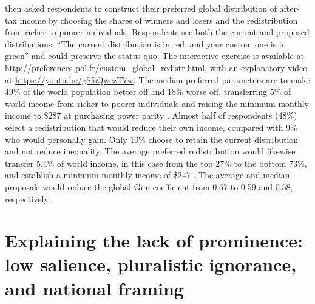 \documentclass[11pt,a4paper]{article}
\begin{document}

\citet{fabre_public_2026} then asked respondents to construct their preferred global distribution of after-tax income by choosing the shares of winners and losers and the redistribution from richer to poorer individuals. Respondents see both the current and proposed distributions: ``The current distribution is in red, and your custom one is in green'' and could preserve the status quo. The interactive exercise is available at \url{http://preferences-pol.fr/custom_global_redistr.html}, with an explanatory video at \url{https://youtu.be/gSfsQwczT7w}. The median preferred parameters are to make 49\% of the world population better off and 18\% worse off, transferring 5\% of world income from richer to poorer individuals and raising the minimum monthly income to \$287 at purchasing power parity \citep[Figure S49]{fabre_public_2026}. Almost half of respondents (48\%) select a redistribution that would reduce their own income, compared with 9\% who would personally gain. Only 10\% choose to retain the current distribution and not reduce inequality. The average preferred redistribution would likewise transfer 5.4\% of world income, in this case from the top 27\% to the bottom 73\%, and establish a minimum monthly income of \$247 \citep[Figure S50]{fabre_public_2026}. The average and median proposals would reduce the global Gini coefficient from 0.67 to 0.59 and 0.58, respectively. 

\section{Explaining the lack of prominence: low salience, pluralistic ignorance, and national framing}
\end{document}
